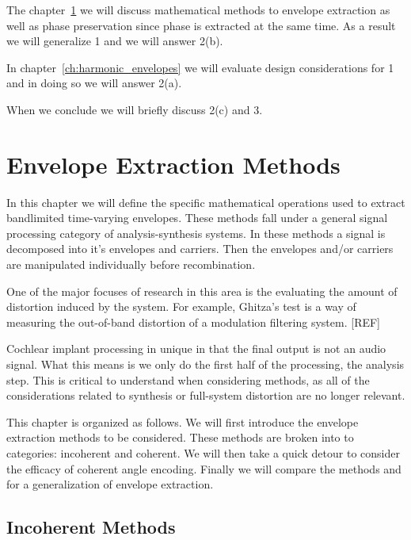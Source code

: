 \documentclass [11pt, proquest,oneside] {uwthesis}[2015/03/03]
\begin{document}
The chapter~\ref{ch:envelope_extraction_chapter} we will discuss mathematical methods to envelope extraction as well as phase preservation since phase is extracted at the same time.  As a result we will generalize 1 and we will answer 2(b).

In chapter~\ref{ch:harmonic_envelopes} we will evaluate design considerations for 1 and in doing so we will answer 2(a).

When we conclude we will briefly discuss 2(c) and 3.


\chapter{Envelope Extraction Methods}\label{ch:envelope_extraction_chapter}

In this chapter we will define the specific mathematical operations used to extract bandlimited time-varying envelopes.  These methods fall under a general signal processing category of analysis-synthesis systems.  In these methods a signal is decomposed into it's envelopes and carriers.  Then the envelopes and/or carriers are manipulated individually before recombination. 

One of the major focuses of research in this area is the evaluating the amount of distortion induced by the system.  For example, Ghitza's test is a way of measuring the out-of-band distortion of a modulation filtering system. [REF] %

Cochlear implant processing in unique in that the final output is not an audio signal.  What this means is we only do the first half of the processing, the analysis step.  This is critical to understand when considering methods, as all of the considerations related to synthesis or full-system distortion are no longer relevant.

This chapter is organized as follows.  We will first introduce the envelope extraction methods to be considered.  These methods are broken into to categories: incoherent and coherent.  We will then take a quick detour to consider the efficacy of coherent angle encoding.  Finally we will compare the methods and for a generalization of envelope extraction.

\section{Incoherent Methods}
\end{document}

